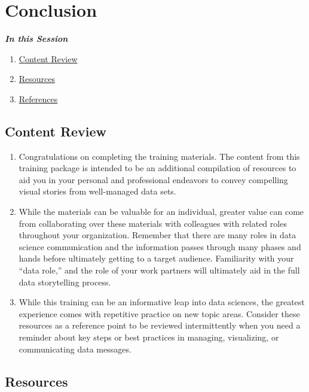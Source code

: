 \documentclass[
]{book}
\providecommand{\tightlist}{%
  \setlength{\itemsep}{0pt}\setlength{\parskip}{0pt}}
\begin{document}
\hypertarget{conclusion}{%
\chapter{Conclusion}\label{conclusion}}

\textbf{\emph{In this Session}}

\begin{enumerate}
\def\labelenumi{\arabic{enumi}.}
\tightlist
\item
  \protect\hyperlink{content-review}{Content Review}
\item
  \protect\hyperlink{resources}{Resources}
\item
  \protect\hyperlink{references}{References}
\end{enumerate}

\hypertarget{content-review}{%
\section{Content Review}\label{content-review}}

\begin{enumerate}
\def\labelenumi{\arabic{enumi}.}
\tightlist
\item
  Congratulations on completing the training materials. The content from this training package is intended to be an additional compilation of resources to aid you in your personal and professional endeavors to convey compelling visual stories from well-managed data sets.
\item
  While the materials can be valuable for an individual, greater value can come from collaborating over these materials with colleagues with related roles throughout your organization. Remember that there are many roles in data science communication and the information passes through many phases and hands before ultimately getting to a target audience. Familiarity with your ``data role,'' and the role of your work partners will ultimately aid in the full data storytelling process.
\item
  While this training can be an informative leap into data sciences, the greatest experience comes with repetitive practice on new topic areas. Consider these resources as a reference point to be reviewed intermittently when you need a reminder about key steps or best practices in managing, visualizing, or communicating data messages.
\end{enumerate}

\hypertarget{resources}{%
\section{Resources}\label{resources}}
\end{document}
